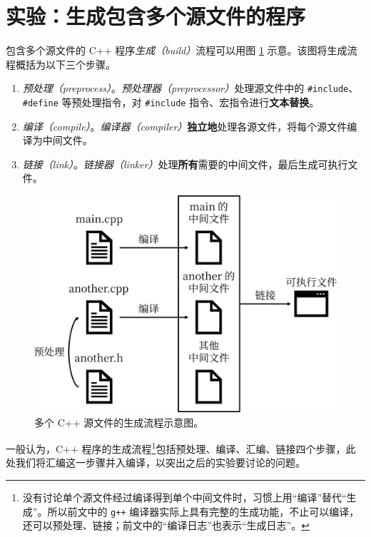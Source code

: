 
\section{实验：生成包含多个源文件的程序\label{sec:experiment-1}}

包含多个源文件的 C++ 程序\emph{生成（build）}流程可以用图 \ref{fig:build-flow} 示意。该图将生成流程概括为以下三个步骤。

\begin{enumerate}
	\item \emph{预处理（preprocess）}。\emph{预处理器（preprocessor）}处理源文件中的 \lstinline[language={[17]C++}]{#include}、\lstinline[language={[17]C++}]{#define} 等预处理指令，对 \lstinline[language={[17]C++}]{#include} 指令、宏指令进行\textbf{文本替换}。
	\item \emph{编译（compile）}。\emph{编译器（compiler）}\textbf{独立地}处理各源文件，将每个源文件编译为中间文件。
	\item \emph{链接（link）}。\emph{链接器（linker）}处理\textbf{所有}需要的中间文件，最后生成可执行文件。
\end{enumerate}

\begin{figure}
	\centering
	\includegraphics[scale=0.15]{assets/build-flow}
	\caption{多个 C++ 源文件的生成流程示意图。}
	\label{fig:build-flow}
\end{figure}

一般认为，C++ 程序的生成流程\footnote{没有讨论单个源文件经过编译得到单个中间文件时，习惯上用“编译”替代“生成”。所以前文中的 \lstinline[language={}]{g++} 编译器实际上具有完整的生成功能，不止可以编译，还可以预处理、链接；前文中的“编译日志”也表示“生成日志”。}包括预处理、编译、汇编、链接四个步骤，此处我们将汇编这一步骤并入编译，以突出之后的实验要讨论的问题。


